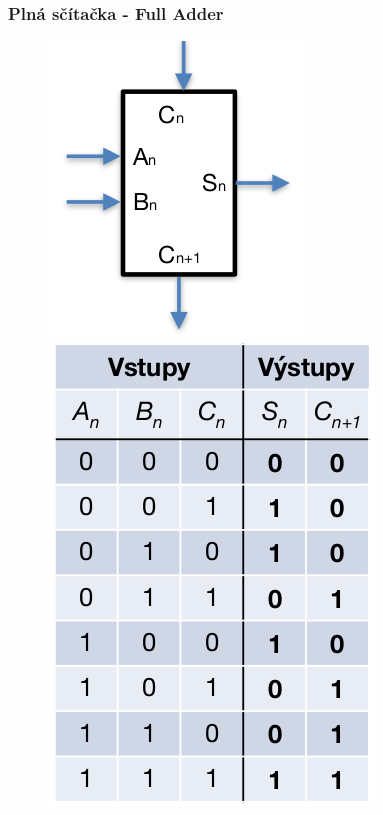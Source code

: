 \subsubsection{Plná sčítačka - Full Adder}
\begin{figure}[h!]
    \centering
    \begin{minipage}[b]{0.4\textwidth}
        \includegraphics[scale = 0.5]{img/FA.png}
    \end{minipage}
    \hfill
    \begin{minipage}[b]{0.4\textwidth}
        \includegraphics[scale = 0.3]{img/FATab.png}
    \end{minipage}
\end{figure}


